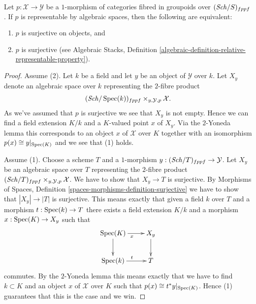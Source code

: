 \begin{lemma}
\label{lemma-representable-by-spaces-surjective}
Let $p : \mathcal{X} \to \mathcal{Y}$ be a $1$-morphism of categories
fibred in groupoids over $(\mathit{Sch}/S)_{fppf}$. If $p$ is
representable by algebraic spaces, then the following are equivalent:
\begin{enumerate}
\item $p$ is surjective on objects, and
\item $p$ is surjective (see
Algebraic Stacks,
Definition \ref{algebraic-definition-relative-representable-property}).
\end{enumerate}
\end{lemma}

\begin{proof}
Assume (2). Let $k$ be a field and let $y$ be an object of
$\mathcal{Y}$ over $k$. Let $X_y$ denote an algebraic space over $k$
representing the $2$-fibre product
$$
(\mathit{Sch}/\mathop{\mathrm{Spec}}(k))_{fppf} \times_{y, \mathcal{Y}, p} \mathcal{X}.
$$
As we've assumed that $p$ is surjective we see that $X_y$ is not empty.
Hence we can find a field extension $K/k$ and a $K$-valued point
$x$ of $X_y$. Via the $2$-Yoneda lemma this corresponds to an object
$x$ of $\mathcal{X}$ over $K$ together with an isomorphism
$p(x) \cong y|_{\mathop{\mathrm{Spec}}(K)}$ and we see that (1) holds.

\medskip\noindent
Assume (1). Choose a scheme $T$ and a $1$-morphism
$y : (\mathit{Sch}/T)_{fppf} \to \mathcal{Y}$. Let
$X_y$ be an algebraic space over $T$ representing the $2$-fibre product
$(\mathit{Sch}/T)_{fppf} \times_{y, \mathcal{Y}, p} \mathcal{X}$.
We have to show that $X_y \to T$ is surjective. By
Morphisms of Spaces, Definition \ref{spaces-morphisms-definition-surjective}
we have to show that $|X_y| \to |T|$ is surjective.
This means exactly that given a field $k$ over $T$ and a
morphism $t : \mathop{\mathrm{Spec}}(k) \to T$ there exists a field extension
$K/k$ and a morphism $x : \mathop{\mathrm{Spec}}(K) \to X_y$ such that
$$
\xymatrix{
\Spec(K) \ar[d] \ar[r]_x & X_y \ar[d] \\
\Spec(k) \ar[r]^t & T
}
$$
commutes. By the $2$-Yoneda lemma this means exactly that we have to find
$k \subset K$ and an object $x$ of $\mathcal{X}$ over $K$ such that
$p(x) \cong t^*y|_{\mathop{\mathrm{Spec}}(K)}$. Hence (1) guarantees that this is
the case and we win.
\end{proof}












